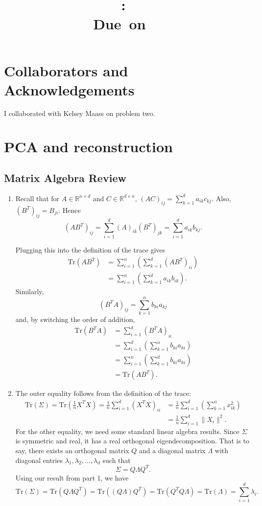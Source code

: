 \documentclass{article}
\title{
    \vspace{2in}
    \textmd{\textbf{\hmwkClass:\ \hmwkTitle}}\\
    \normalsize\vspace{0.1in}\small{Due\ on\ \hmwkDueDate\ }\\
    \vspace{3in}
}
\author{\textbf{\hmwkAuthorName}}
\date{}
\newcommand{\R}{\mathbb{R}}
\newcommand{\Tr}{\mathrm{Tr}}
\begin{document}
\maketitle

\pagebreak

\section{Collaborators and Acknowledgements}
I collaborated with Kelsey Maass on problem two.

\section{PCA and reconstruction}
\subsection{Matrix Algebra Review}
\begin{enumerate}
	\item Recall that for $A\in\R^{n\times d}$ and $C\in\R^{d\times n}$, $(AC)_{ij} = \sum^d_{k=1}a_{ik}c_{kj}$. Also, $(B^T)_{ij} = B_{ji}$. Hence
	\[
		(AB^T)_{ij} = \sum^d_{i=1}(A)_{ik}(B^T)_{jk} = \sum^d_{i=1}a_{ik}b_{kj}.
	\]

	Plugging this into the definition of the trace gives
	\begin{align*}
		\Tr(AB^T) &= \sum^n_{i=1}\left(\sum^d_{k=1}(AB^T)_{ii}\right)\\
		&= \sum^n_{i=1}\left(\sum^d_{k=1}a_{ik}b_{ik}\right).
	\end{align*}
	Similarly,
	\[
		(B^TA)_{ij} = \sum^{n}_{k=1}b_{ki}a_{kj}
	\]
	and, by switching the order of addition,
	\begin{align*}
		\Tr(B^TA) &= \sum^d_{i=1}\left(B^TA\right)_{ii}\\
		&= \sum^d_{i=1}\left(\sum^n_{k=1}b_{ki}a_{ki} \right) \\
		&= \sum^n_{i=1}\left(\sum^d_{k=1}b_{ki}a_{ki} \right) \\
		&= \Tr(AB^T).
	\end{align*}

	\item The outer equality follows from the definition of the trace:
	\begin{align*}
		\Tr(\Sigma) = \Tr\left(\tfrac1nX^TX\right) = \frac1n\sum^d_{i=1}(X^TX)_{ii} &= \frac1n \sum^d_{i=1}\left( \sum^n_{k=1}x_{ik}^2 \right)\\
		&= \frac1n\sum^d_{i=1}\|X_i\|^2.
	\end{align*}
	For the other equality, we need some standard linear algebra results. Since $\Sigma$ is symmetric and real, it has a real orthogonal eigendecomposition. That is to say, there exists an orthogonal matrix $Q$ and a diagonal matrix $\Lambda$ with diagonal entries $\lambda_1,\lambda_2,\dots,\lambda_d$ such that
	\[
		\Sigma = Q\Lambda Q^T.
	\]
	Using our result from part 1, we have
	\[
		\Tr(\Sigma) = \Tr\left(Q\Lambda Q^T\right) = \Tr\left((Q\Lambda) Q^T\right) = \Tr\left(Q^TQ\Lambda\right) = \Tr(\Lambda) = \sum^d_{i=1}\lambda_i.
	\]
\end{enumerate}
\end{document}
